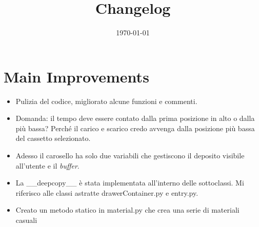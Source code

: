 \documentclass[a4paper]{article}
\begin{document}
	\title{Changelog}
	\date{\today}
	\maketitle
	
	\newpage
	
	\section*{Main Improvements}
	
	\begin{itemize}[label=]
		\item Pulizia del codice, migliorato alcune funzioni e commenti.
		
		\item Domanda: il tempo deve essere contato dalla prima posizione in alto o dalla più bassa? Perché il carico e scarico credo avvenga dalla posizione più bassa del cassetto selezionato.
		
		\item Adesso il carosello ha solo due variabili che gestiscono il deposito visibile all'utente e il \emph{buffer}.
		
		\item La \textsf{\_\_deepcopy\_\_} è stata implementata all'interno delle sottoclassi. Mi riferisco alle classi astratte \textsf{drawerContainer.py} e \textsf{entry.py}.
		
		\item Creato un metodo statico in \textsf{material.py} che crea una serie di materiali casuali 
	\end{itemize}
\end{document}
